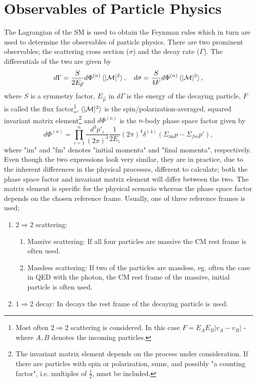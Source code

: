 \chapter{Observables of Particle Physics}
\label{chp:obs}
The Lagrangian of the SM is used to obtain the Feynman rules which in turn are used to determine the observables of particle physics. There are two prominent observables; the scattering cross section ($\sigma$) and the decay rate ($\Gamma$). The differentials of the two are given by
\begin{equation}
	d\Gamma=\frac{S}{2E_{\vec{p}}}d\Phi^{(n)}\braket{|\mathcal{M}|^2}, \quad d\sigma=\frac{S}{4F}d\Phi^{(n)}\braket{|\mathcal{M}|^2},
	\label{obs}
\end{equation} 
where $S$ is a symmetry factor, $E_{\vec{p}}$ in $d\Gamma$ is the energy of the decaying particle, $F$ is called the flux factor\footnote{Most often $2\Rightarrow 2$ scattering is considered. In this case $F=E_AE_B|v_A-v_B|$ - where $A,B$ denotes the incoming particles.}, $\braket{|\mathcal{M}|^2}$ is the spin/polarization-averaged, squared invariant matrix element\footnote{The invariant matrix element depends on the process under consideration. If there are particles with spin or polarization, sums, and possibly "a counting factor", i.e. multiples of $\frac{1}{2}$, must be included.} and $d\Phi^{(n)}$ is the $n$-body phase space factor given by
\begin{equation}
	d\Phi^{(n)}=\prod_{i=1}^{n}\frac{d^3p'_i}{(2\pi)^3}\frac{1}{2E_i}(2\pi)^4
	\delta^{(4)}(\Sigma_{\text{im}}p-\Sigma_{fm}p'),
	\label{PS}
\end{equation} 
where "im" and "fm" denotes "initial momenta" and "final momenta", respectively. Even though the two expressions look very similar, they are in practice, due to the inherent differences in the physical processes, different to calculate; both the phase space factor and invariant matrix element will differ between the two. The matrix element is specific for the physical scenario whereas the phase space factor depends on the chosen reference frame. Usually, one of three reference frames is used;
\begin{enumerate}
	\item $2\Rightarrow 2$ scattering:
	\begin{enumerate}
		\item Massive scattering: If all four particles are massive the CM rest frame is often used.
		\item Massless scattering: If two of the particles are massless, eg. often the case in QED with the photon, the CM rest frame of the massive, initial particle is often used.
	\end{enumerate}
	\item $1\Rightarrow 2$ decay: In decays the rest frame of the decaying particle is used.
\end{enumerate}

